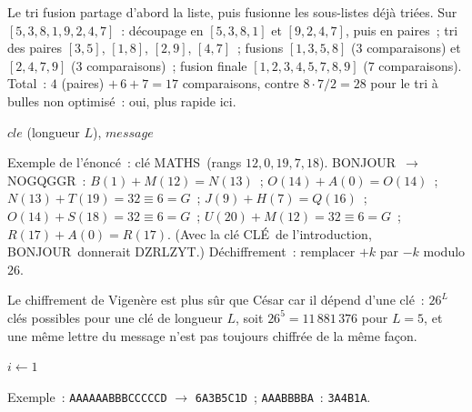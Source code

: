 Le tri fusion partage d'abord la liste, puis fusionne les sous-listes déjà triées.
Sur $[5,3,8,1,9,2,4,7]$~: d\'ecoupage en $[5,3,8,1]$ et $[9,2,4,7]$, puis en paires~; tri des paires $[3,5]$, $[1,8]$, $[2,9]$, $[4,7]$~;
fusions $[1,3,5,8]$ ($3$ comparaisons) et $[2,4,7,9]$ ($3$ comparaisons)~; fusion finale $[1,2,3,4,5,7,8,9]$ ($7$ comparaisons).
Total~: $4$ (paires) $+\,6+7=17$ comparaisons, contre $8\cdot7/2=28$ pour le tri \`a bulles non optimis\'e~: oui, plus rapide ici.


\begin{algorithm}[H]
\caption{Chiffrement de Vigen\`ere}
\Lire $\mathit{cle}$ (longueur $L$), $\mathit{message}$\;
\end{algorithm}

Exemple de l'\'enonc\'e~: cl\'e \og MATHS\fg\ (rangs $12,0,19,7,18$).
\og BONJOUR\fg\ $\to$ \og NOGQGGR\fg~:
$B(1)+M(12)=N(13)$~; $O(14)+A(0)=O(14)$~; $N(13)+T(19)=32\equiv6=G$~;
$J(9)+H(7)=Q(16)$~; $O(14)+S(18)=32\equiv6=G$~; $U(20)+M(12)=32\equiv6=G$~; $R(17)+A(0)=R(17)$.
(Avec la cl\'e \og CL\'E\fg\ de l'introduction, \og BONJOUR\fg\ donnerait \og DZRLZYT\fg.)
D\'echiffrement~: remplacer $+k$ par $-k$ modulo $26$.

Le chiffrement de Vigen\`ere est plus s\^ur que C\'esar car il d\'epend d'une cl\'e~:
$26^L$ cl\'es possibles pour une cl\'e de longueur $L$, soit $26^5=11\,881\,376$ pour $L=5$,
et une m\^eme lettre du message n'est pas toujours chiffr\'ee de la m\^eme fa\c con.


\begin{algorithm}[H]
\caption{Compression RLE}
$i \leftarrow 1$\;
\end{algorithm}

Exemple~: \texttt{AAAAAABBBCCCCCD} $\to$ \texttt{6A3B5C1D}~; \texttt{AAABBBBA}~:
\texttt{3A4B1A}.

